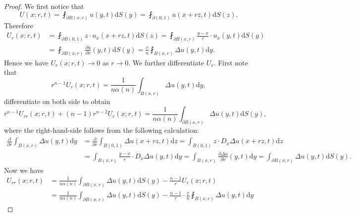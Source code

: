\begin{proof}
We first notice that 
$$
U\left( x;r,t \right) =\fint_{\partial B\left( x,r \right)}{u\left( y,t \right) \mathrm{d}S\left( y \right)}=\fint_{\partial \left( 0,1 \right)}{u\left( x+rz,t \right) \mathrm{d}S\left( z \right)}.
$$
Therefore 
$$
\begin{aligned}
U_r\left( x;r,t \right) &=\fint_{\partial B\left( 0,1 \right)}{z\cdot u_x\left( x+rz,t \right) \mathrm{d}S\left( z \right)}=\fint_{\partial B\left( x,r \right)}{\frac{y-x}{r}\cdot u_x\left( y,t \right) \mathrm{d}S\left( y \right)}
\\
&=\fint_{\partial B\left( x,r \right)}{\frac{\partial u}{\partial \nu}\left( y,t \right) \mathrm{d}S\left( y \right)}=\frac{r}{n}\fint_{B\left( x,r \right)}{\Delta u\left( y,t \right) \mathrm{d}y}.
\end{aligned}
$$
Hence we have $U_r(x;r,t)\to 0$ as $r\to 0$. We further differentiate $U_r$. First note that 
$$
r^{n-1}U_r\left( x;r,t \right) =\frac{1}{n\alpha \left( n \right)}\int_{B\left( x,r \right)}{\Delta u\left( y,t \right) \mathrm{d}y},
$$
differentiate on both side to obtain 
$$
r^{n-1}U_{rr}\left( x;r,t \right) +\left( n-1 \right) r^{n-2}U_r\left( x;r,t \right) =\frac{1}{n\alpha \left( n \right)}\int_{\partial B\left( x,r \right)}{\Delta u\left( y,t \right) \mathrm{d}S\left( y \right)},
$$
where the right-hand-side follows from the following calculation: 
$$
\begin{aligned}
\frac{\partial}{\partial r}\int_{B\left( x,r \right)}{\Delta u\left( y,t \right) \mathrm{d}y}&=\frac{\partial}{\partial r}\int_{B\left( 0,1 \right)}{\Delta u\left( x+rz,t \right) \mathrm{d}z}=\int_{B\left( 0,1 \right)}{z\cdot D_x\Delta u\left( x+rz,t \right) \mathrm{d}z}
\\
&=\int_{B\left( x,r \right)}{\frac{y-x}{r}\cdot D_x\Delta u\left( y,t \right) \mathrm{d}y}=\int_{B\left( x,r \right)}{\frac{\partial \Delta u}{\partial \nu}\left( y,t \right) \mathrm{d}y}=\int_{\partial B\left( x,r \right)}{\Delta u\left( y,t \right) \mathrm{d}S\left( y \right)}.
\end{aligned}
$$
Now we have 
$$
\begin{aligned}
U_{rr}\left( x;r,t \right) &=\frac{1}{n\alpha \left( n \right)}\int_{\partial B\left( x,r \right)}{\Delta u\left( y,t \right) \mathrm{d}S\left( y \right)}-\frac{n-1}{r}U_r\left( x;r,t \right) 
\\
&=\frac{1}{n\alpha \left( n \right)}\int_{\partial B\left( x,r \right)}{\Delta u\left( y,t \right) \mathrm{d}S\left( y \right)}-\frac{n-1}{r}\cdot \frac{r}{n}\fint_{B\left( x,r \right)}{\Delta u\left( y,t \right) \mathrm{d}y}

\end{aligned}$$
\end{proof}
